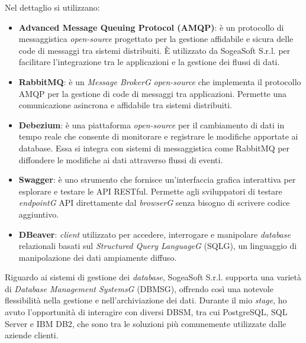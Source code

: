    \vspace{1em}
    
    \noindent Nel dettaglio si utilizzano:
    \begin{itemize}
        \item \textbf{Advanced Message Queuing Protocol (AMQP)}:  è un protocollo di messaggistica \textit{open-source} progettato per la gestione affidabile e sicura delle code di messaggi tra sistemi distribuiti. È utilizzato da SogeaSoft S.r.l. per facilitare l'integrazione tra le applicazioni e la gestione dei flussi di dati.
        
        \item \textbf{RabbitMQ}: è un \textit{Message BrokerG} \textit{open-source} che implementa il protocollo AMQP per la gestione di code di messaggi tra applicazioni. Permette una comunicazione asincrona e affidabile tra sistemi distribuiti.

        \item \textbf{Debezium}: è una piattaforma \textit{open-source} per il cambiamento di dati in tempo reale che consente di monitorare e registrare le modifiche apportate ai database. Essa si integra con sistemi di messaggistica come RabbitMQ per diffondere le modifiche ai dati attraverso flussi di eventi.
        
        \item \textbf{Swagger}: è uno strumento che fornisce un'interfaccia grafica interattiva per esplorare e testare le API RESTful. Permette agli sviluppatori di testare \textit{endpointG} API direttamente dal \textit{browserG} senza bisogno di scrivere codice aggiuntivo.
        
        \item \textbf{DBeaver}: \textit{client} utilizzato per accedere, interrogare e manipolare \textit{database} relazionali basati sul \textit{Structured Query LanguageG} (SQLG), un linguaggio di manipolazione dei dati ampiamente diffuso.
    \end{itemize}

    \noindent Riguardo ai sistemi di gestione dei \textit{database}, SogeaSoft S.r.l. supporta una varietà di \textit{Database Management SystemsG} (DBMSG), offrendo così una notevole flessibilità nella gestione e nell'archiviazione dei dati. Durante il mio \textit{stage}, ho avuto l'opportunità di interagire con diversi DBSM, tra cui PostgreSQL, SQL Server e IBM DB2, che sono tra le soluzioni più comunemente utilizzate dalle aziende clienti.
    
    
